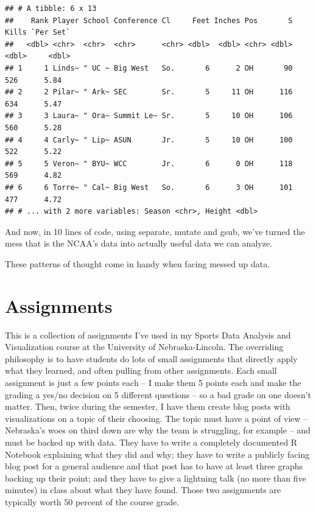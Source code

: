 \documentclass[]{book}
\begin{document}
\begin{verbatim}
## # A tibble: 6 x 13
##    Rank Player School Conference Cl     Feet Inches Pos       S Kills `Per Set`
##   <dbl> <chr>  <chr>  <chr>      <chr> <dbl>  <dbl> <chr> <dbl> <dbl>     <dbl>
## 1     1 Linds~ " UC ~ Big West   So.       6      2 OH       90   526      5.84
## 2     2 Pilar~ " Ark~ SEC        Sr.       5     11 OH      116   634      5.47
## 3     3 Laura~ " Ora~ Summit Le~ Sr.       5     10 OH      106   560      5.28
## 4     4 Carly~ " Lip~ ASUN       Jr.       5     10 OH      100   522      5.22
## 5     5 Veron~ " BYU~ WCC        Jr.       6      0 OH      118   569      4.82
## 6     6 Torre~ " Cal~ Big West   So.       6      3 OH      101   477      4.72
## # ... with 2 more variables: Season <chr>, Height <dbl>
\end{verbatim}

And now, in 10 lines of code, using separate, mutate and gsub, we've turned the mess that is the NCAA's data into actually useful data we can analyze.

These patterns of thought come in handy when facing messed up data.

\hypertarget{assignments}{%
\chapter{Assignments}\label{assignments}}

This is a collection of assignments I've used in my Sports Data Analysis and Visualization course at the University of Nebraska-Lincoln. The overriding philosophy is to have students do lots of small assignments that directly apply what they learned, and often pulling from other assignments. Each small assignment is just a few points each -- I make them 5 points each and make the grading a yes/no decision on 5 different questions -- so a bad grade on one doesn't matter. Then, twice during the semester, I have them create blog posts with visualizations on a topic of their choosing. The topic must have a point of view -- Nebraska's woes on third down are why the team is struggling, for example -- and must be backed up with data. They have to write a completely documented R Notebook explaining what they did and why; they have to write a publicly facing blog post for a general audience and that post has to have at least three graphs backing up their point; and they have to give a lightning talk (no more than five minutes) in class about what they have found. Those two assignments are typically worth 50 percent of the course grade.
\end{document}
